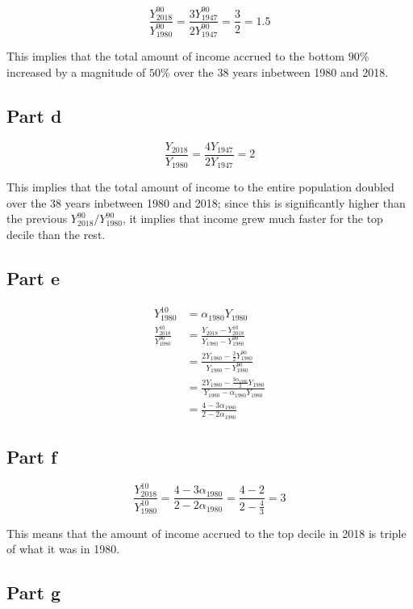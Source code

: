 \documentclass[12pt,letterpaper]{article}
\theoremstyle{definition}
\begin{document}
\[
  \frac{Y_{2018}^{90}}{Y_{1980}^{90}} = \frac{3Y_{1947}^{90}}{2Y_{1947}^{90}}
  = \frac{3}{2} = 1.5
\]

This implies that the total amount of income accrued to the bottom $90\%$
increased by a magnitude of $50\%$ over the $38$ years inbetween 1980 and 2018.

\subsection*{Part d}

\[
  \frac{Y_{2018}}{Y_{1980}} = \frac{4Y_{1947}}{2Y_{1947}} = 2
\]


This implies that the total amount of income to the entire population doubled
over the $38$ years inbetween 1980 and 2018; since this is significantly higher
than the previous $Y_{2018}^{90} / Y_{1980}^{90}$, it implies that income grew
much faster for the top decile than the rest.

\subsection*{Part e}

\begin{align*}
  Y_{1980}^{10} &= \alpha_{1980}Y_{1980} \\
  \frac{Y_{2018}^{10}}{Y_{1980}^{90}} &= \frac{Y_{2018} -
    Y_{2018}^{10}}{Y_{1980} - Y_{1980}^{90}} \\
                &= \frac{2Y_{1980} - \frac{3}{2}Y_{1980}^{90}}{Y_{1980} - Y_{1980}^{90}} \\
                &= \frac{2Y_{1980} - \frac{3\alpha_{1980}}{2}Y_{1980}}{Y_{1980} - \alpha_{1980}Y_{1980}} \\
                &= \frac{4 - 3\alpha_{1980}}{2 - 2\alpha_{1980}}
\end{align*}

\subsection*{Part f}

\[
  \frac{Y_{2018}^{10}}{Y_{1980}^{10}} = \frac{4 - 3\alpha_{1980}}{2 -
    2\alpha_{1980}} = \frac{4 - 2}{2 - \frac{4}{3}} = 3
\]

This means that the amount of income accrued to the top decile in 2018 is triple of what
it was in 1980.

\subsection*{Part g}
\end{document}
